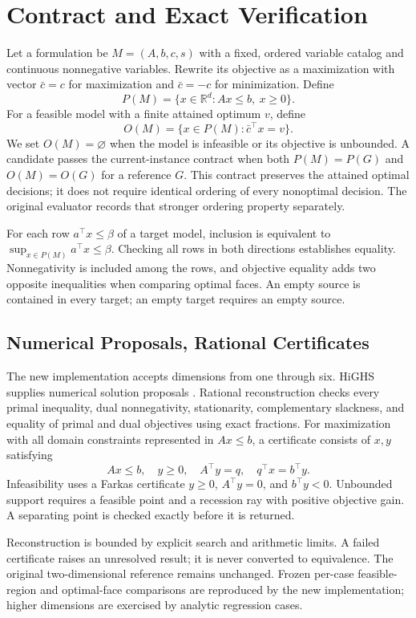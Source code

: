 \documentclass[letterpaper]{article}
\begin{document}
\section{Contract and Exact Verification}
Let a formulation be $M=(A,b,c,s)$ with a fixed, ordered variable catalog and continuous nonnegative variables. Rewrite its objective as a maximization with vector $\bar c=c$ for maximization and $\bar c=-c$ for minimization. Define
\[
 P(M)=\{x\in\mathbb{R}^d:Ax\leq b,\ x\geq0\}.
\]
For a feasible model with a finite attained optimum $v$, define
\[
 O(M)=\{x\in P(M):\bar c^\top x=v\}.
\]
We set $O(M)=\varnothing$ when the model is infeasible or its objective is unbounded. A candidate passes the current-instance contract when both $P(M)=P(G)$ and $O(M)=O(G)$ for a reference $G$. This contract preserves the attained optimal decisions; it does not require identical ordering of every nonoptimal decision. The original evaluator records that stronger ordering property separately.

For each row $a^\top x\leq\beta$ of a target model, inclusion is equivalent to $\sup_{x\in P(M)} a^\top x\leq\beta$. Checking all rows in both directions establishes equality. Nonnegativity is included among the rows, and objective equality adds two opposite inequalities when comparing optimal faces. An empty source is contained in every target; an empty target requires an empty source.

\subsection{Numerical Proposals, Rational Certificates}
The new implementation accepts dimensions from one through six. HiGHS supplies numerical solution proposals \citep{huangfu2018parallel}. Rational reconstruction checks every primal inequality, dual nonnegativity, stationarity, complementary slackness, and equality of primal and dual objectives using exact fractions. For maximization with all domain constraints represented in $Ax\leq b$, a certificate consists of $x,y$ satisfying
\[
 Ax\leq b,\quad y\geq0,\quad A^\top y=q,\quad
 q^\top x=b^\top y .
\]
Infeasibility uses a Farkas certificate $y\geq0$, $A^\top y=0$, and $b^\top y<0$. Unbounded support requires a feasible point and a recession ray with positive objective gain. A separating point is checked exactly before it is returned.

Reconstruction is bounded by explicit search and arithmetic limits. A failed certificate raises an unresolved result; it is never converted to equivalence. The original two-dimensional reference remains unchanged. Frozen per-case feasible-region and optimal-face comparisons are reproduced by the new implementation; higher dimensions are exercised by analytic regression cases.
\end{document}
